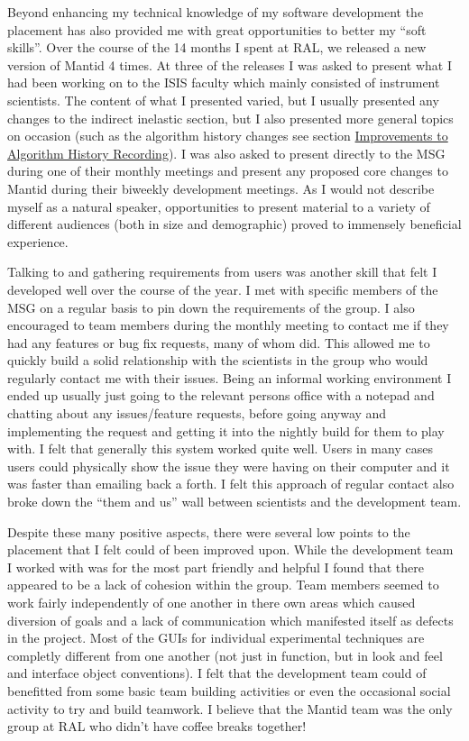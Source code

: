 \documentclass[paper=a4, fontsize=11pt]{scrartcl}	%
\numberwithin{equation}{section}															%
\numberwithin{figure}{section}																%
\numberwithin{table}{section}
\begin{document}
Beyond enhancing my technical knowledge of my software development the
placement has also provided me with great opportunities to better my
``soft skills''. Over the course of the 14 months I spent at RAL, we
released a new version of Mantid 4 times. At three of the releases I was
asked to present what I had been working on to the ISIS faculty which
mainly consisted of instrument scientists. The content of what I
presented varied, but I usually presented any changes to the indirect
inelastic section, but I also presented more general topics on occasion
(such as the algorithm history changes see section
\hyperref[improvements-to-algorithm-history-recording]{Improvements to
Algorithm History Recording}). I was also asked to present directly to
the MSG during one of their monthly meetings and present any proposed
core changes to Mantid during their biweekly development meetings. As I
would not describe myself as a natural speaker, opportunities to present
material to a variety of different audiences (both in size and
demographic) proved to immensely beneficial experience.

Talking to and gathering requirements from users was another skill that
felt I developed well over the course of the year. I met with specific
members of the MSG on a regular basis to pin down the requirements of
the group. I also encouraged to team members during the monthly meeting
to contact me if they had any features or bug fix requests, many of whom
did. This allowed me to quickly build a solid relationship with the
scientists in the group who would regularly contact me with their
issues. Being an informal working environment I ended up usually just
going to the relevant persons office with a notepad and chatting about
any issues/feature requests, before going anyway and implementing the
request and getting it into the nightly build for them to play with. I
felt that generally this system worked quite well. Users in many cases
users could physically show the issue they were having on their computer
and it was faster than emailing back a forth. I felt this approach of
regular contact also broke down the ``them and us'' wall between
scientists and the development team.

Despite these many positive aspects, there were several low points to
the placement that I felt could of been improved upon. While the
development team I worked with was for the most part friendly and
helpful I found that there appeared to be a lack of cohesion within the
group. Team members seemed to work fairly independently of one another
in there own areas which caused diversion of goals and a lack of
communication which manifested itself as defects in the project. Most of
the GUIs for individual experimental techniques are completly different
from one another (not just in function, but in look and feel and
interface object conventions). I felt that the development team could of
benefitted from some basic team building activities or even the
occasional social activity to try and build teamwork. I believe that the
Mantid team was the only group at RAL who didn't have coffee breaks
together!
\end{document}
